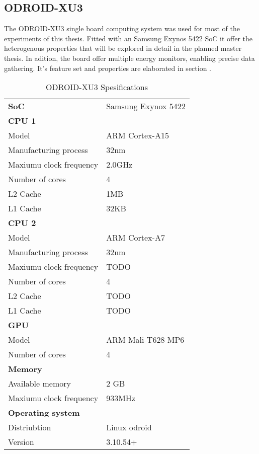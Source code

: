 \subsection{ODROID-XU3}
The ODROID-XU3 single board computing system was used for most of the experiments of this thesis.
Fitted with an Samsung Exynos 5422 SoC it offer the heterogenous properties that will be explored in detail in the planned master thesis.
In adition, the board offer multiple energy monitors, enabling precise data gathering.
It's feature set and properties are elaborated in section .

\begin{table}[h]
  \begin{tabular}{ll}
    \textbf{SoC}              & Samsung Exynox 5422 \\
    \textbf{CPU 1}            &  \\
    Model                     & ARM Cortex-A15 \\
    Manufacturing process     & 32nm \\
    Maxiumu clock frequency   & 2.0GHz \\
    Number of cores           & 4 \\
    L2 Cache                  & 1MB \\
    L1 Cache                  & 32KB \\
    \textbf{CPU 2}            &  \\
    Model                     & ARM Cortex-A7 \\
    Manufacturing process     & 32nm \\
    Maxiumu clock frequency   & TODO \\
    Number of cores           & 4 \\
    L2 Cache                  & TODO \\
    L1 Cache                  & TODO \\
    \textbf{GPU}              &  \\
    Model                     & ARM Mali-T628 MP6 \\
    Number of cores           & 4 \\
    \textbf{Memory}           &  \\
    Available memory          & 2 GB \\
    Maxiumu clock frequency   & 933MHz \\
    \textbf{Operating system} &  \\
    Distriubtion              & Linux odroid \\
    Version                   & 3.10.54+
  \end{tabular}
  \caption{ODROID-XU3 Spesifications\label{overflow}}
\end{table}

